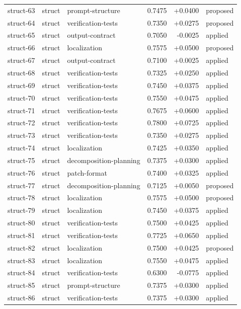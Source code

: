 \begin{center}
\begin{longtable}{llp{5.2cm}rrl}
struct-63 & struct & prompt-structure & 0.7475 & +0.0400 & proposed \\
struct-64 & struct & verification-tests & 0.7350 & +0.0275 & proposed \\
struct-65 & struct & output-contract & 0.7050 & -0.0025 & applied \\
struct-66 & struct & localization & 0.7575 & +0.0500 & proposed \\
struct-67 & struct & output-contract & 0.7100 & +0.0025 & applied \\
struct-68 & struct & verification-tests & 0.7325 & +0.0250 & applied \\
struct-69 & struct & verification-tests & 0.7450 & +0.0375 & applied \\
struct-70 & struct & verification-tests & 0.7550 & +0.0475 & applied \\
struct-71 & struct & verification-tests & 0.7675 & +0.0600 & applied \\
struct-72 & struct & verification-tests & 0.7800 & +0.0725 & applied \\
struct-73 & struct & verification-tests & 0.7350 & +0.0275 & applied \\
struct-74 & struct & localization & 0.7425 & +0.0350 & applied \\
struct-75 & struct & decomposition-planning & 0.7375 & +0.0300 & applied \\
struct-76 & struct & patch-format & 0.7400 & +0.0325 & applied \\
struct-77 & struct & decomposition-planning & 0.7125 & +0.0050 & proposed \\
struct-78 & struct & localization & 0.7575 & +0.0500 & proposed \\
struct-79 & struct & localization & 0.7450 & +0.0375 & applied \\
struct-80 & struct & verification-tests & 0.7500 & +0.0425 & applied \\
struct-81 & struct & verification-tests & 0.7725 & +0.0650 & applied \\
struct-82 & struct & localization & 0.7500 & +0.0425 & proposed \\
struct-83 & struct & localization & 0.7550 & +0.0475 & applied \\
struct-84 & struct & verification-tests & 0.6300 & -0.0775 & applied \\
struct-85 & struct & prompt-structure & 0.7375 & +0.0300 & applied \\
struct-86 & struct & verification-tests & 0.7375 & +0.0300 & applied \\

\end{longtable}
\end{center}
